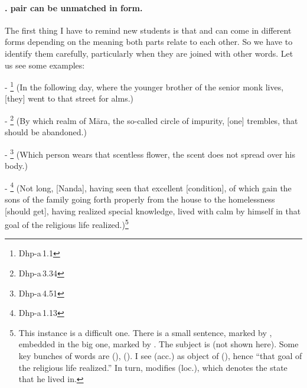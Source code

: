 \paragraph*{.  pair can be unmatched in form.} The first thing I have to remind new students is that  and  can come in different forms depending on the meaning both parts relate to each other. So we have to identify them carefully, particularly when they are joined with other words. Let us see some examples:\par
- \footnote{Dhp-a\,1.1} (In the following day, where the younger brother of the senior monk lives, [they] went to that street for alms.)\par
- \footnote{Dhp-a\,3.34} (By which realm of M\=ara, the so-called circle of impurity, [one] trembles, that should be abandoned.)\par
- \footnote{Dhp-a\,4.51} (Which person wears that scentless flower, the scent does not spread over his body.)\par
- \footnote{Dhp-a\,1.13} (Not long, [Nanda], having seen that excellent [condition], of which gain the sons of the family going forth properly from the house to the homelessness [should get], having realized special knowledge, lived with calm by himself in that goal of the religious life realized.)\footnote{This instance is a difficult one. There is a small sentence, marked by , embedded in the big one, marked by . The subject is  (not shown here). Some key bunches of words are  (),  (). I see  (acc.) as object of  (), hence ``that goal of the religious life realized.'' In turn,  modifies  (loc.), which denotes the state that he lived in.}\par

